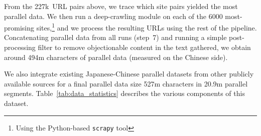 \documentclass[11pt,a4paper]{article}
\begin{document}
From the 227k~URL pairs above, we trace which site pairs yielded the most parallel data.  We then run a deep-crawling module on each of the 6000 most-promising sites,\footnote{Using the Python-based \texttt{scrapy} tool} and we process the resulting URLs using the rest of the pipeline.  Concatenating parallel data from all runs (step~7) and running a simple post-processing filter to remove objectionable content in the text gathered, we obtain around 494m characters of parallel data (measured on the Chinese side). 

We also integrate existing Japanese-Chinese parallel datasets from other publicly available sources for a final parallel data size 527m characters in 20.9m parallel segments. Table~\ref{tab:data_statistics} describes the various components of this dataset.

 
\end{document}
